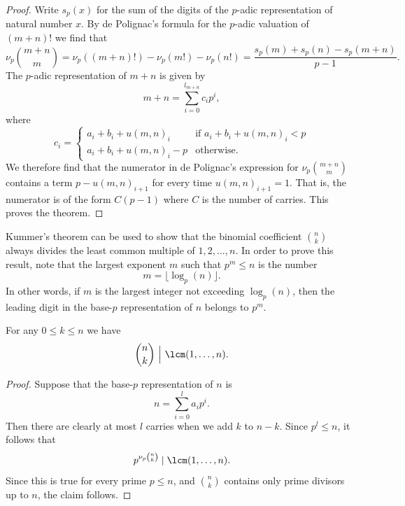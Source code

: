 \begin{proof}
  Write $s_p(x)$ for the sum of the digits of the $p$-adic representation of natural number $x$. By de Polignac's formula for the $p$-adic valuation of $(m+n)!$ we find that
  \begin{equation*}
    \nu_p\binom{m+n}{m} = \nu_p((m+n)!)-\nu_p(m!)-\nu_p(n!) =
    \frac{s_p(m)+s_p(n)-s_p(m+n)}{p-1}.
  \end{equation*}
  The $p$-adic representation of $m+n$ is given by
  \begin{equation*}
    m+n = \sum_{i=0}^{l_{m+n}}c_ip^i,
  \end{equation*}
  where
  \begin{equation*}
    c_i =
    \begin{cases}
      a_i+b_i + u(m,n)_i & \text{if } a_i+b_i+u(m,n)_i<p \\
      a_i+b_i + u(m,n)_i - p & \text{otherwise}.
    \end{cases}
  \end{equation*}
  We therefore find that the numerator in de Polignac's expression for $\nu_p\binom{m+n}{m}$ contains a term $p-u(m,n)_{i+1}$ for every time $u(m,n)_{i+1}=1$. That is, the numerator is of the form $C(p-1)$ where $C$ is the number of carries. This proves the theorem.
\end{proof}

Kummer's theorem can be used to show that the binomial coefficient $\binom{n}{k}$ always divides the least common multiple of $1,2,\ldots,n$. In order to prove this result, note that the largest exponent $m$ such that $p^m\leq n$ is the number
\begin{equation*}
  m=\lfloor \log_p(n)\rfloor.
\end{equation*}
In other words, if $m$ is the largest integer not exceeding $\log_p(n)$, then the leading digit in the base-$p$ representation of $n$ belongs to $p^m$. 

\begin{corollary}\label{corollary:kummers-theorem}
  For any $0\leq k\leq n$ we have
  \begin{equation*}
    \binom{n}{k}\,\,\Big|\,\,\lcm(1,\ldots,n).
  \end{equation*}
\end{corollary}

\begin{proof}
  Suppose that the base-$p$ representation of $n$ is
  \begin{equation*}
    n=\sum_{i=0}^{l}a_ip^i.
  \end{equation*}
  Then there are clearly at most $l$ carries when we add $k$ to $n-k$. Since $p^l\leq n$, it follows that
  \begin{equation*}
    p^{\nu_p\binom{n}{k}}\mid\lcm(1,\ldots,n).
  \end{equation*}
  Since this is true for every prime $p\leq n$, and $\binom{n}{k}$ contains only prime divisors up to $n$, the claim follows.
\end{proof}

